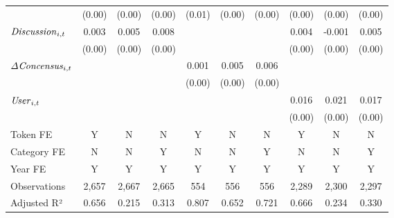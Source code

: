 {\begin{tabular}{l*{9}{c}}
                    &      (0.00)         &      (0.00)         &      (0.00)         &      (0.01)         &      (0.00)         &      (0.00)         &      (0.00)         &      (0.00)         &      (0.00)         \\
${\it Discussion}_{i,t}$&       0.003\sym{*}  &       0.005\sym{**} &       0.008\sym{***}&                     &                     &                     &       0.004\sym{*}  &      -0.001         &       0.005\sym{**} \\
                    &      (0.00)         &      (0.00)         &      (0.00)         &                     &                     &                     &      (0.00)         &      (0.00)         &      (0.00)         \\
${\it \Delta Concensus}_{i,t}$&                     &                     &                     &       0.001         &       0.005         &       0.006\sym{*}  &                     &                     &                     \\
                    &                     &                     &                     &      (0.00)         &      (0.00)         &      (0.00)         &                     &                     &                     \\
${\it User}_{i,t}$  &                     &                     &                     &                     &                     &                     &       0.016\sym{***}&       0.021\sym{***}&       0.017\sym{***}\\
                    &                     &                     &                     &                     &                     &                     &      (0.00)         &      (0.00)         &      (0.00)         \\
\midrule
Token FE            &           Y         &           N         &           N         &           Y         &           N         &           N         &           Y         &           N         &           N         \\
Category FE         &           N         &           N         &           Y         &           N         &           N         &           Y         &           N         &           N         &           Y         \\
Year FE             &           Y         &           Y         &           Y         &           Y         &           Y         &           Y         &           Y         &           Y         &           Y         \\
Observations        &       2,657         &       2,667         &       2,665         &         554         &         556         &         556         &       2,289         &       2,300         &       2,297         \\
Adjusted R²         &       0.656         &       0.215         &       0.313         &       0.807         &       0.652         &       0.721         &       0.666         &       0.234         &       0.330         \\
\bottomrule
\end{tabular}
}

